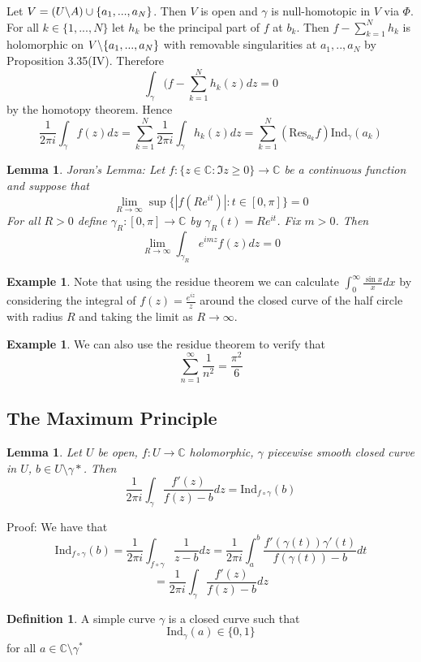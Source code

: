 \documentclass[11pt]{article}
\theoremstyle{plain}
\newtheorem{lemma}[theorem]{Lemma}
\theoremstyle{definition}
\newtheorem{definition}[theorem]{Definition}
\newtheorem{example}[theorem]{Example}
\newcommand{\C}{\mathbb{C}}
\newcommand{\Ind}{\text{Ind}}
\newcommand{\Res}{\text{Res}}
\newcommand{\sla}{\char`\\}
\begin{document}
Let $V = (U \sla A) \cup \{a_1, ..., a_N\}$. Then $V$ is open and $\gamma$ is null-homotopic in $V$ via $\Phi$. For all $k \in \{ 1 ,..., N\}$ let $h_k$ be the principal part of $f$ at $b_k$. Then $f - \sum_{k=1}^N h_k$ is holomorphic on $V \sla \{a_1, ..., a_N\}$ with removable singularities at $a_1, .., a_N$ by Proposition 3.35(IV). Therefore 
$$ \int_{\gamma} (f - \sum_{k=1}^N h_k(z) dz = 0 $$ 
by the homotopy theorem. Hence 
$$ \frac{1}{2\pi i} \int_\gamma f(z)dz = \sum_{k=1}^N \frac{1}{2\pi i} \int_\gamma h_k(z)dz = \sum_{k=1}^N (\Res_{a_k} f) \Ind_\gamma(a_k) $$

\begin{lemma}
Joran's Lemma: Let $f: \{z \in \C: \Im z \geq 0 \} \to \C$ be a continuous function and suppose that 
$$ \lim_{R \to \infty} \sup \{ |f(Re^{it})| : t \in [0, \pi]\} = 0 $$
For all $R > 0$ define $\gamma_R : [0, \pi] \to \C$ by $\gamma_R(t) = Re^{it}$. Fix $m > 0$. Then 
$$ \lim_{R \to \infty} \int_{\gamma_R} e^{imz} f(z) dz = 0 $$
\end{lemma}

\begin{example}
Note that using the residue theorem we can calculate $\int_0^\infty \frac{\sin x}{x} dx$ by considering the integral of $f(z) = \frac{e^{iz}}{z}$ around the closed curve of the half circle with radius $R$ and taking the limit as $R \to \infty$. 
\end{example}

\begin{example}
We can also use the residue theorem to verify that 
$$ \sum_{n=1}^\infty \frac{1}{n^2} = \frac{\pi^2}{6} $$
\end{example}

\subsection{The Maximum Principle}
\begin{lemma} 
Let $U$ be open, $f:U\to\C$ holomorphic, $\gamma$ piecewise smooth closed curve in $U$, $b \in U \setminus \gamma*$. Then 
$$ \frac{1}{2\pi i} \int_\gamma \frac{f'(z)}{f(z) - b} dz = \Ind_{f \circ \gamma} (b) $$
\end{lemma}

Proof: We have that 
$$ \Ind_{f \circ \gamma}(b) = \frac{1}{2\pi i} \int_{f\circ \gamma} \frac{1}{z-b}dz = \frac{1}{2\pi i} \int_a^b \frac{f'(\gamma(t))\gamma'(t)}{f(\gamma(t)) - b} dt $$
$$ = \frac{1}{2\pi i} \int_\gamma \frac{f'(z)}{f(z) - b} dz $$

\begin{definition}
A simple curve $\gamma$ is a closed curve such that 
$$ \Ind_\gamma(a) \in \{0, 1\} $$
for all $a \in \C \setminus \gamma^*$
\end{definition}
\end{document}
